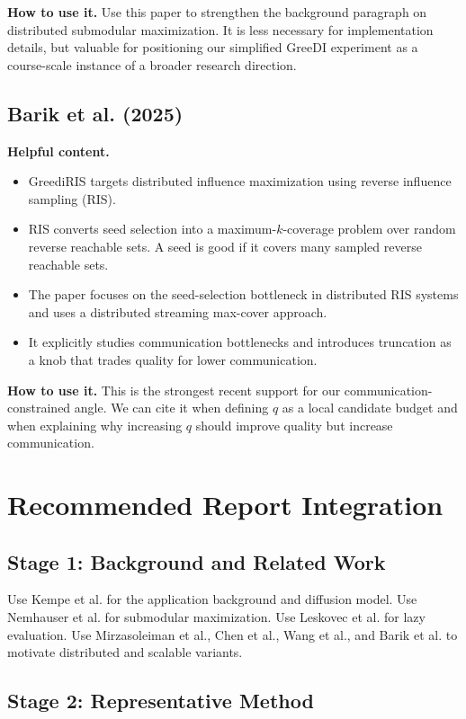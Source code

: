 \documentclass[10pt]{article}
\begin{document}
\textbf{How to use it.} Use this paper to strengthen the background paragraph on
distributed submodular maximization. It is less necessary for implementation
details, but valuable for positioning our simplified GreeDI experiment as a
course-scale instance of a broader research direction.

\subsection{Barik et al. (2025)}

\textbf{Helpful content.}
\begin{itemize}
\item GreediRIS targets distributed influence maximization using reverse
influence sampling (RIS).
\item RIS converts seed selection into a maximum-$k$-coverage problem over
random reverse reachable sets. A seed is good if it covers many sampled reverse
reachable sets.
\item The paper focuses on the seed-selection bottleneck in distributed RIS
systems and uses a distributed streaming max-cover approach.
\item It explicitly studies communication bottlenecks and introduces truncation
as a knob that trades quality for lower communication.
\end{itemize}

\textbf{How to use it.} This is the strongest recent support for our
communication-constrained angle. We can cite it when defining $q$ as a local
candidate budget and when explaining why increasing $q$ should improve quality
but increase communication.

\section{Recommended Report Integration}

\subsection{Stage 1: Background and Related Work}

Use Kempe et al. for the application background and diffusion model. Use
Nemhauser et al. for submodular maximization. Use Leskovec et al. for lazy
evaluation. Use Mirzasoleiman et al., Chen et al., Wang et al., and Barik et al.
to motivate distributed and scalable variants.

\subsection{Stage 2: Representative Method}
\end{document}
